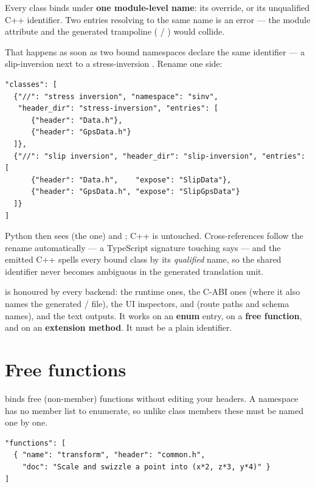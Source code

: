 Every class binds under \textbf{one module-level name}: its 
override, or its unqualified C++ identifier. Two entries resolving to the same
name is an error --- the module attribute and the generated trampoline
( / ) would collide.

That happens as soon as two bound namespaces declare the same identifier ---
a slip-inversion  next to a stress-inversion
. Rename one side:

\begin{lstlisting}[style=json]
"classes": [
  {"//": "stress inversion", "namespace": "sinv",
   "header_dir": "stress-inversion", "entries": [
      {"header": "Data.h"},
      {"header": "GpsData.h"}
  ]},
  {"//": "slip inversion", "header_dir": "slip-inversion", "entries": [
      {"header": "Data.h",    "expose": "SlipData"},
      {"header": "GpsData.h", "expose": "SlipGpsData"}
  ]}
]
\end{lstlisting}

Python then sees  (the  one) and ;
C++ is untouched. Cross-references follow the rename automatically --- a
TypeScript signature touching  says  --- and the
emitted C++ spells every bound class by its \emph{qualified} name, so the shared
identifier never becomes ambiguous in the generated translation unit.

 is honoured by every backend: the runtime ones, the C-ABI ones
(where it also names the generated  /  file), the UI
inspectors,  and  (route paths and schema names), and
the text outputs. It works on an \textbf{enum} entry, on a \textbf{free
function}, and on an \textbf{extension method}. It must be a plain identifier.

\section{Free functions}
\label{sec:functions}

 binds free (non-member) functions without editing your
headers. A namespace has no member list to enumerate, so unlike class members
these must be named one by one.

\begin{lstlisting}[style=json]
"functions": [
  { "name": "transform", "header": "common.h",
    "doc": "Scale and swizzle a point into (x*2, z*3, y*4)" }
]
\end{lstlisting}

